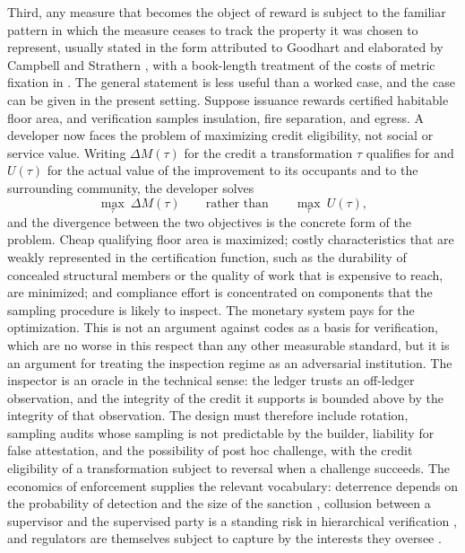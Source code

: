 \documentclass[11pt]{article}
\theoremstyle{definition}
\begin{document}
Third, any measure that becomes the object of reward is subject to the familiar pattern in which the measure ceases to track the property it was chosen to represent, usually stated in the form attributed to Goodhart \cite{goodhart1975} and elaborated by Campbell \cite{campbell1979} and Strathern \cite{strathern1997}, with a book-length treatment of the costs of metric fixation in \cite{muller2018}. The general statement is less useful than a worked case, and the case can be given in the present setting. Suppose issuance rewards certified habitable floor area, and verification samples insulation, fire separation, and egress. A developer now faces the problem of maximizing credit eligibility, not social or service value. Writing $\Delta M(\tau)$ for the credit a transformation $\tau$ qualifies for and $U(\tau)$ for the actual value of the improvement to its occupants and to the surrounding community, the developer solves
\begin{equation}
\max_{\tau}\ \Delta M(\tau) \qquad\text{rather than}\qquad \max_{\tau}\ U(\tau),
\label{eq:goodhart}
\end{equation}
and the divergence between the two objectives is the concrete form of the problem. Cheap qualifying floor area is maximized; costly characteristics that are weakly represented in the certification function, such as the durability of concealed structural members or the quality of work that is expensive to reach, are minimized; and compliance effort is concentrated on components that the sampling procedure is likely to inspect. The monetary system pays for the optimization. This is not an argument against codes as a basis for verification, which are no worse in this respect than any other measurable standard, but it is an argument for treating the inspection regime as an adversarial institution. The inspector is an oracle in the technical sense: the ledger trusts an off-ledger observation, and the integrity of the credit it supports is bounded above by the integrity of that observation. The design must therefore include rotation, sampling audits whose sampling is not predictable by the builder, liability for false attestation, and the possibility of post hoc challenge, with the credit eligibility of a transformation subject to reversal when a challenge succeeds. The economics of enforcement supplies the relevant vocabulary: deterrence depends on the probability of detection and the size of the sanction \cite{becker1968}, collusion between a supervisor and the supervised party is a standing risk in hierarchical verification \cite{tirole1986}, and regulators are themselves subject to capture by the interests they oversee \cite{stigler1971}.
\end{document}
